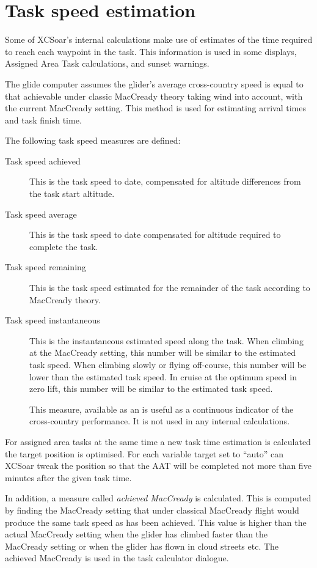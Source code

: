 \section{Task speed estimation}\label{sec:task-speed-estim}

Some of XCSoar's internal calculations make use of estimates of the
time required to reach each waypoint in the task.  This information is
used in some {\InfoBox} displays, Assigned Area Task calculations, and
sunset warnings.

The glide computer assumes the glider's average cross-country speed is
equal to that achievable under classic MacCready theory taking wind
into account, with the current MacCready setting.  This method is used
for estimating arrival times and task finish time.

The following task speed measures are defined:
\begin{description}
\item[Task speed achieved]  This is the task speed to date, compensated
for altitude differences from the task start altitude.
\item[Task speed average]  This is the task speed to date compensated
for altitude required to complete the task.
\item[Task speed remaining]  This is the task speed estimated for the
  remainder of the task according to MacCready theory.
\item[Task speed instantaneous]  This is the instantaneous estimated speed 
along the task.  When climbing at the MacCready setting, this number
will be similar to the estimated task speed.  When climbing slowly or
flying off-course, this number will be lower than the estimated task
speed.  In cruise at the optimum speed in zero lift, this number will
be similar to the estimated task speed.

This measure, available as an {\InfoBox} is useful as a continuous
indicator of the cross-country performance.  It is not used in any
internal calculations.
\end{description}

For assigned area tasks at the same time a new task time estimation is
calculated the target position is optimised. \tip For each variable target set
to ``auto'' can XCSoar tweak the position so that the AAT will be completed not
more than five minutes after the given task time.

In addition, a measure called {\em achieved MacCready} is calculated.
This is computed by finding the MacCready setting that under classical
MacCready flight would produce the same task speed as has been
achieved.  This value is higher than the actual MacCready setting when
the glider has climbed faster than the MacCready setting or when the
glider has flown in cloud streets etc.  The achieved MacCready is used
in the task calculator dialogue.

